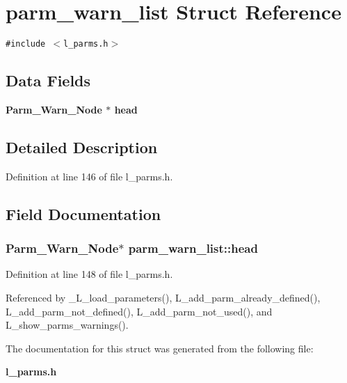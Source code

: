 \section{parm\_\-warn\_\-list Struct Reference}
\label{structparm__warn__list}
{\tt \#include $<$l\_\-parms.h$>$}

\subsection*{Data Fields}
\begin{CompactItemize}
\item 
\bf{Parm\_\-Warn\_\-Node} $\ast$ \bf{head}
\end{CompactItemize}


\subsection{Detailed Description}




Definition at line 146 of file l\_\-parms.h.

\subsection{Field Documentation}
\subsubsection{\setlength{\rightskip}{0pt plus 5cm}\bf{Parm\_\-Warn\_\-Node}$\ast$ \bf{parm\_\-warn\_\-list::head}}\label{structparm__warn__list_010b718d3b92e1e097412e3292756e07}




Definition at line 148 of file l\_\-parms.h.

Referenced by \_\-L\_\-load\_\-parameters(), L\_\-add\_\-parm\_\-already\_\-defined(), L\_\-add\_\-parm\_\-not\_\-defined(), L\_\-add\_\-parm\_\-not\_\-used(), and L\_\-show\_\-parms\_\-warnings().

The documentation for this struct was generated from the following file:\begin{CompactItemize}
\item 
\bf{l\_\-parms.h}\end{CompactItemize}
